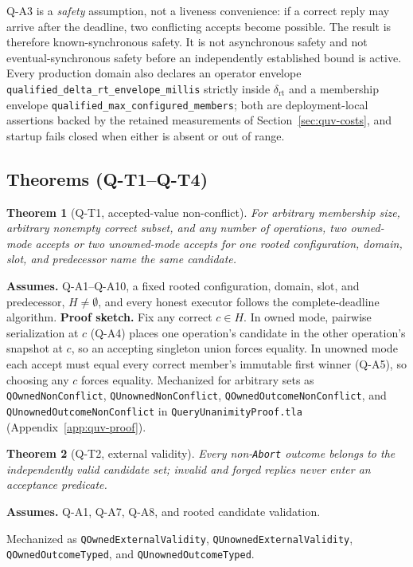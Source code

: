 \documentclass[11pt]{article}
\newtheorem{theorem}{Theorem}
\newcommand{\code}[1]{\texttt{#1}}
\begin{document}
Q-A3 is a \emph{safety} assumption, not a liveness convenience: if a correct
reply may arrive after the deadline, two conflicting accepts become possible.
The result is therefore known-synchronous safety. It is not asynchronous
safety and not eventual-synchronous safety before an independently
established bound is active. Every production domain also declares an
operator envelope \code{qualified\_delta\_rt\_envelope\_millis} strictly
inside \(\delta_{\mathrm{rt}}\) and a membership envelope
\code{qualified\_max\_configured\_members}; both are deployment-local
assertions backed by the retained measurements of
Section~\ref{sec:quv-costs}, and startup fails closed when either is absent or
out of range.

\subsection{Theorems (Q-T1--Q-T4)}
\label{sec:quv-theorems}

\begin{theorem}[Q-T1, accepted-value non-conflict]
\label{thm:quv-t1}
For arbitrary membership size, arbitrary nonempty correct subset, and any
number of operations, two owned-mode accepts or two unowned-mode accepts for
one rooted configuration, domain, slot, and predecessor name the same
candidate.
\end{theorem}
\noindent\textbf{Assumes.} Q-A1--Q-A10, a fixed rooted configuration, domain,
slot, and predecessor, \(H \neq \emptyset\), and every honest executor follows
the complete-deadline algorithm. \textbf{Proof sketch.} Fix any correct
\(c \in H\). In owned mode, pairwise serialization at \(c\) (Q-A4) places one
operation's candidate in the other operation's snapshot at \(c\), so an
accepting singleton union forces equality. In unowned mode each accept must
equal every correct member's immutable first winner (Q-A5), so choosing any
\(c\) forces equality. Mechanized for arbitrary sets as
\code{QOwnedNonConflict}, \code{QUnownedNonConflict},
\code{QOwnedOutcomeNonConflict}, and \code{QUnownedOutcomeNonConflict} in
\code{QueryUnanimityProof.tla} (Appendix~\ref{app:quv-proof}).

\begin{theorem}[Q-T2, external validity]
\label{thm:quv-t2}
Every non-\code{Abort} outcome belongs to the independently valid candidate
set; invalid and forged replies never enter an acceptance predicate.
\end{theorem}
\noindent\textbf{Assumes.} Q-A1, Q-A7, Q-A8, and rooted candidate validation.
\par\noindent Mechanized as \code{QOwnedExternalValidity},
\code{QUnownedExternalValidity}, \code{QOwnedOutcomeTyped}, and
\code{QUnownedOutcomeTyped}.
\end{document}
